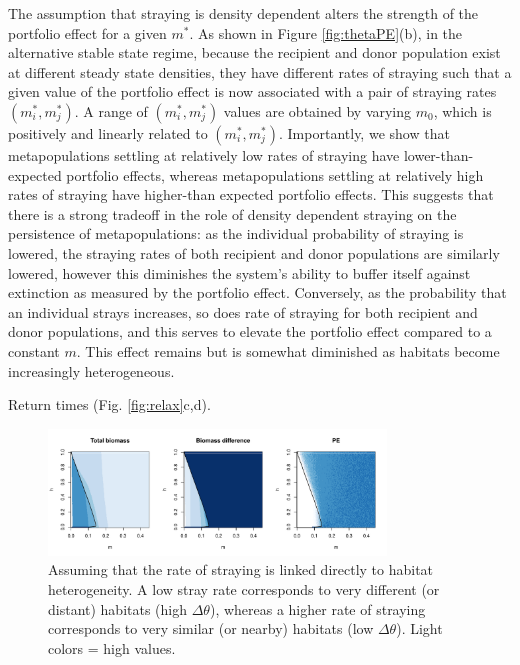 \documentclass[twocolumn,preprintnumbers,amsmath,amssymb,superscriptaddress]{revtex4}
\begin{document}
The assumption that straying is density dependent alters the strength of the portfolio effect for a given $m^*$.
As shown in Figure \ref{fig:thetaPE}(b), in the alternative stable state regime, because the recipient and donor population exist at different steady state densities, they have different rates of straying such that a given value of the portfolio effect is now associated with a pair of straying rates $(m_i^*,m_j^*)$.
A range of $(m_i^*,m_j^*)$ values are obtained by varying $m_0$, which is positively and linearly related to $(m_i^*,m_j^*)$.
Importantly, we show that metapopulations settling at relatively low rates of straying have lower-than-expected portfolio effects, whereas metapopulations settling at relatively high rates of straying have higher-than expected portfolio effects.
This suggests that there is a strong tradeoff in the role of density dependent straying on the persistence of metapopulations: as the individual probability of straying is lowered, the straying rates of both recipient and donor populations are similarly lowered, however this diminishes the system's ability to buffer itself against extinction as measured by the portfolio effect.
Conversely, as the probability that an individual strays increases, so does rate of straying for both recipient and donor populations, and this serves to elevate the portfolio effect compared to a constant $m$.
This effect remains but is somewhat diminished as habitats become increasingly heterogeneous.

Return times (Fig. \ref{fig:relax}c,d).
\\

\begin{figure}
  \captionsetup{justification=raggedright,
singlelinecheck=false
}
  \centering
  \includegraphics[width=0.8\textwidth]{figs2/fig_MDPE_hm_mtheta.pdf}
  \caption{
  Assuming that the rate of straying is linked directly to habitat heterogeneity. A low stray rate corresponds to very different (or distant) habitats (high $\Delta\theta$), whereas a higher rate of straying corresponds to very similar (or nearby) habitats (low $\Delta\theta$). Light colors = high values.
  } \label{fig:mtheta}
\end{figure}
\end{document}
